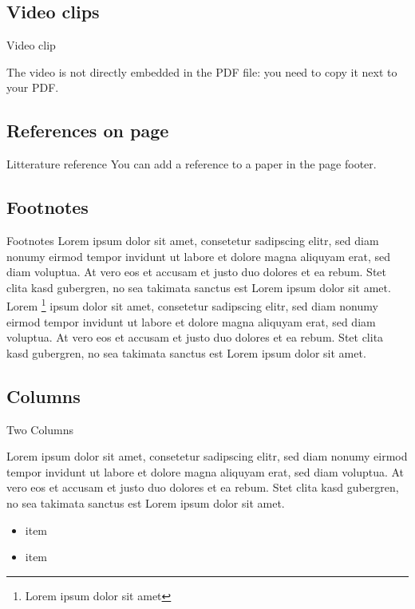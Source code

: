 \documentclass[compress,aspectratio=169]{beamer}
\begin{document}
\subsection{Video clips}

\begin{frame}{Video clip}
    \centering

    The video is not directly embedded in the PDF file: you need to copy it next
    to your PDF.

\end{frame}



\subsection{References on page}

{

    \begin{frame}{Litterature reference}
        You can add a reference to a paper in the page footer.
    \end{frame}
}

\subsection{Footnotes}
\begin{frame}{Footnotes}
    Lorem ipsum dolor sit amet, consetetur sadipscing elitr, sed diam nonumy
    eirmod tempor invidunt ut labore et dolore magna aliquyam erat, sed diam
    voluptua. At vero eos et accusam et justo duo dolores et ea rebum. Stet
    clita kasd gubergren, no sea takimata sanctus est Lorem ipsum dolor sit
    amet. Lorem \footnote{Lorem ipsum dolor sit amet} ipsum dolor sit amet,
    consetetur sadipscing elitr, sed diam nonumy eirmod tempor invidunt ut
    labore et dolore magna aliquyam erat, sed diam voluptua. At vero eos et
    accusam et justo duo dolores et ea rebum. Stet clita kasd gubergren, no sea
    takimata sanctus est Lorem ipsum dolor sit amet.

\end{frame}

\subsection{Columns}
\begin{frame}{Two Columns}
    \begin{multicols}{2}
        Lorem ipsum dolor sit amet, consetetur sadipscing elitr, sed diam nonumy eirmod tempor invidunt ut labore et dolore magna aliquyam erat, sed diam voluptua. At vero eos et accusam et justo duo dolores et ea rebum. Stet clita kasd gubergren, no sea takimata sanctus est Lorem ipsum dolor sit amet.
        \begin{itemize}
            \item item
            \item item
        \end{itemize}
    \end{multicols}
\end{frame}
\end{document}
